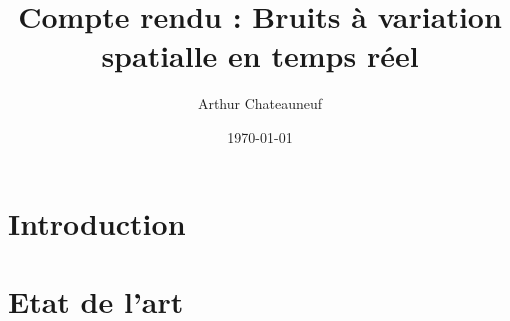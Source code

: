 \documentclass{article}
\title{Compte rendu : Bruits à variation spatialle en temps réel} %
\author{Arthur Chateauneuf} %
\date{\today} %
\begin{document}
\maketitle

\tableofcontents

\section{Introduction}

\section{Etat de l'art}
\end{document}
